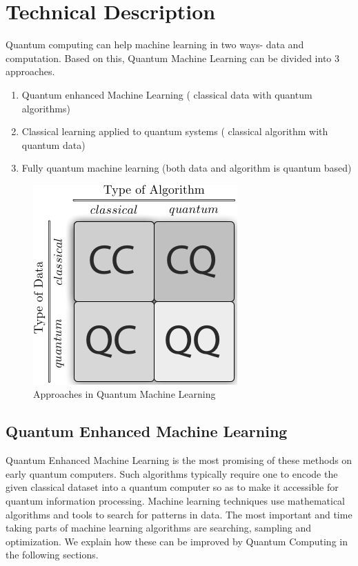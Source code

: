 \chapter{Technical Description}\label{ch:technical_description}
Quantum computing can help machine learning in two ways- data and computation. Based on this, Quantum Machine Learning can be divided into 3 approaches.
\begin{enumerate}
\item Quantum enhanced Machine Learning ( classical data with quantum algorithms) 
\item Classical learning applied to quantum systems ( classical algorithm with quantum data)
\item Fully quantum machine learning (both data and algorithm is quantum based)
\end{enumerate}
\begin{figure}[H]
\centering\includegraphics[width=.3\textwidth]{images/approach.png}
\caption{Approaches in Quantum Machine Learning}
\end{figure}
\section{Quantum Enhanced Machine Learning}
Quantum Enhanced Machine Learning is the most promising of these methods on early quantum computers. Such algorithms typically require one to encode the given classical dataset into a quantum computer so as to make it accessible for quantum information processing. Machine learning techniques use mathematical algorithms and tools to search for patterns in data. The most important and time taking parts of machine learning algorithms are searching, sampling and optimization. We explain how these can be improved by Quantum Computing in the following sections.
